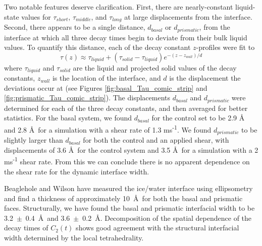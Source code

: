 \documentclass[11pt]{article}
\begin{document}
\begin{doublespace}
Two notable features deserve clarification.  First, there are
nearly-constant liquid-state values for $\tau_{short}$,
$\tau_{middle}$, and $\tau_{long}$ at large displacements from the
interface. Second, there appears to be a single distance, $d_{basal}$
or $d_{prismatic}$, from the interface at which all three decay times
begin to deviate from their bulk liquid values. To quantify this
distance, each of the decay constant $z$-profiles were fit to
\begin{equation}\label{tauFit}
\tau(z)\approx\tau_{liquid}+(\tau_{solid}-\tau_{liquid})e^{-(z-z_{wall})/d}
\end{equation}
where $\tau_{liquid}$ and $\tau_{solid}$ are the liquid and projected
solid values of the decay constants, $z_{wall}$ is the location of the
interface, and $d$ is the displacement the deviations occur at (see
Figures \ref{fig:basal_Tau_comic_strip} and
\ref{fig:prismatic_Tau_comic_strip}). The displacements $d_{basal}$
and $d_{prismatic}$ were determined for each of the three decay
constants, and then averaged for better statistics.
For the basal system, we found $d_{basal}$ for the control set to be
2.9 \AA\, and 2.8 \AA\ for a simulation with a shear rate of 1.3
ms\textsuperscript{-1}. We found $d_{prismatic}$ to be slightly
larger than $d_{basal}$ for both the control and an applied shear,
with displacements of 3.6 \AA\ for the control system and 3.5 \AA\ for
a simulation with a 2 ms\textsuperscript{-1} shear rate. From this we
can conclude there is no apparent dependence on the shear rate for the dynamic interface
width. 

Beaglehole and Wilson have measured the ice/water interface using
ellipsometry and find a thickness of approximately 10~\AA\ for both
the basal and prismatic faces.\cite{Beaglehole93} Structurally, we
have found the basal and prismatic interfacial width to be
3.2~$\pm$~0.4~\AA\ and 3.6~$\pm$~0.2~\AA.  Decomposition of
the spatial dependence of the decay times of $C_2(t)$ shows good
agreement with the structural interfacial width determined by the
local tetrahedrality.



\end{doublespace}
\end{document}
